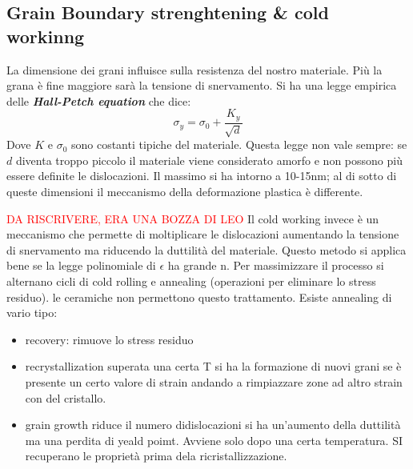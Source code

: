\subsection{Grain Boundary strenghtening \& cold workinng}

La dimensione dei grani influisce sulla resistenza del nostro materiale.
Più la grana è fine maggiore sarà la tensione di snervamento. Si ha una legge empirica delle \textbf{\textit{Hall-Petch equation}} che dice:
\begin{equation}
    \sigma_y=\sigma_0+\frac{K_y}{\sqrt{d}}
\end{equation}
Dove $K$ e $\sigma_0$ sono costanti tipiche del materiale. Questa legge non vale sempre: se $d$ diventa troppo piccolo il materiale viene considerato amorfo e non possono più essere definite le dislocazioni. Il massimo si ha intorno a 10-15nm; al di sotto di queste dimensioni il meccanismo della deformazione plastica è differente.

\textcolor{red}{DA RISCRIVERE, ERA UNA BOZZA DI LEO}
Il cold working invece è un meccanismo che permette di moltiplicare le dislocazioni aumentando la tensione di snervamento ma riducendo la duttilità del materiale. Questo metodo si applica bene se la legge polinomiale di $\epsilon$ ha grande n. Per massimizzare il processo si alternano cicli di cold rolling e annealing (operazioni per eliminare lo stress residuo). le ceramiche non permettono questo trattamento.
Esiste annealing di vario tipo:
\begin{itemize}
    \item recovery: rimuove lo stress residuo 
    \item recrystallization superata una certa T si ha la formazione di nuovi grani se è presente un certo valore di strain andando a rimpiazzare zone ad altro strain con del cristallo.
    \item grain growth riduce il numero didislocazioni  si ha un'aumento della duttilità ma una perdita di yeald poimt. Avviene solo dopo una certa temperatura. SI recuperano le proprietà prima dela ricristallizzazione.
\end{itemize}